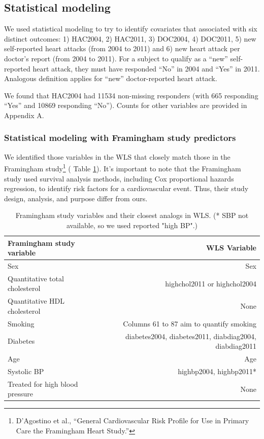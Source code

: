 \documentclass[11pt,]{article}
\let\rmarkdownfootnote\footnote%
\def\footnote{\protect\rmarkdownfootnote}
\begin{document}
\subsection{Statistical modeling}\label{statistical-modeling}

We used statistical modeling to try to identify covariates that
associated with six distinct outcomes: 1) HAC2004, 2) HAC2011, 3)
DOC2004, 4) DOC2011, 5) new self-reported heart attacks (from 2004 to
2011) and 6) new heart attack per doctor's report (from 2004 to 2011).
For a subject to qualify as a ``new'' self-reported heart attack, they
must have responded ``No'' in 2004 and ``Yes'' in 2011. Analogous
definition applies for ``new'' doctor-reported heart attack.

We found that HAC2004 had 11534 non-missing responders (with 665
responding ``Yes'' and 10869 responding ``No''). Counts for other
variables are provided in Appendix A.

\subsubsection{Statistical modeling with Framingham study
predictors}\label{statistical-modeling-with-framingham-study-predictors}

We identified those variables in the WLS that closely match those in the
Framingham study\footnote{D'Agostino et al., ``General Cardiovascular
  Risk Profile for Use in Primary Care the Framingham Heart Study.'' } (
Table \ref{tab:fram2wls}). It's important to note that the Framingham
study used survival analysis methods, including Cox proportional hazards
regression, to identify risk factors for a cardiovascular event. Thus,
their study design, analysis, and purpose differ from ours.

\begin{table}
\begin{tabular}{l r}\label{tab:fram2wls}
Framingham study variable & WLS Variable\\
\hline
Sex & Sex\\
Quantitative total cholesterol & highchol2011 or highchol2004\\
Quantitative HDL cholesterol & None\\
Smoking & Columns 61 to 87 aim to quantify smoking \\
Diabetes & diabetes2004, diabetes2011, diabdiag2004, diabdiag2011\\
Age & Age\\
Systolic BP & highbp2004, highbp2011* \\
Treated for high blood pressure & None\\
\hline
\end{tabular}
\caption{Framingham study variables and their closest analogs in WLS. (* SBP not available, so we used reported "high BP".)}
\end{table}
\end{document}

